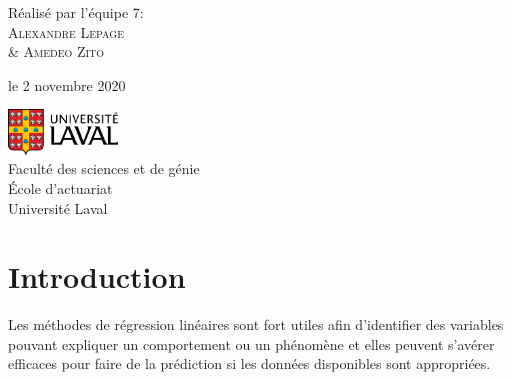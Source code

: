 \documentclass{article}
\begin{document}
\begin{titlepage}
		
		Réalisé par l'équipe 7:\\
		{\scshape\Large Alexandre Lepage\\
		\& Amedeo Zito} %
		
		\vspace*{5\baselineskip}
		
		le 2 novembre 2020
		
		\vspace{0.4\baselineskip} %
		
		\vfill %
		
		
		\includegraphics[height=1.2cm]{UL_P.pdf}\\
		
		Faculté des sciences et de génie\\
		École d'actuariat\\
		Université Laval
		
		\vspace*{3\baselineskip}
		
	\end{titlepage}
	
%	
%	
%	
%	


\section{Introduction}
Les méthodes de régression linéaires sont fort utiles afin d'identifier des variables pouvant expliquer un comportement ou un phénomène et elles peuvent s'avérer efficaces pour faire de la prédiction si les données disponibles sont appropriées.\\
\end{document}
